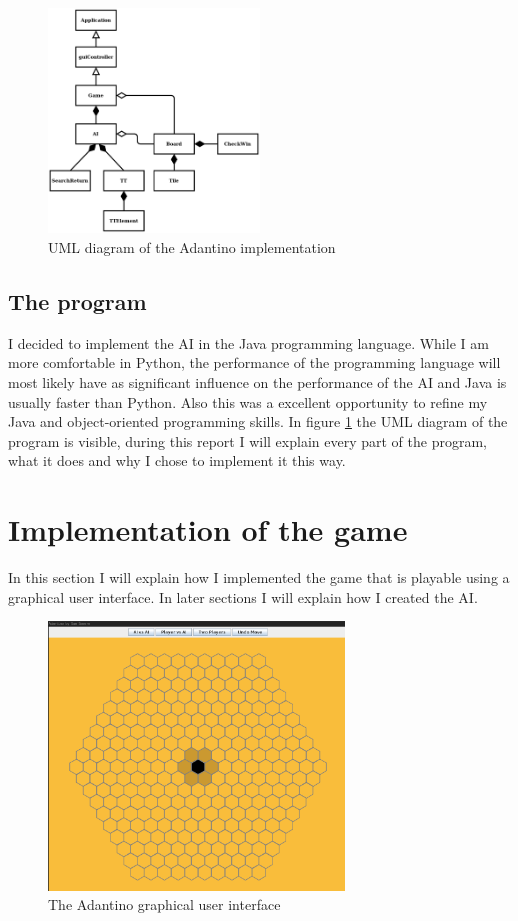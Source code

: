 \documentclass{article}
\begin{document}
\begin{figure}[ht]
    \centering
    \includegraphics[width = 0.5\textwidth]{images/AdantinoAiUml.png}
    \caption{UML diagram of the Adantino implementation}
    \label{fig:UML}
\end{figure}

\subsection{The program}
I decided to implement the AI in the Java programming language. While I am more comfortable in Python, the performance of the programming language will most likely have as significant influence on the performance of the AI and Java is usually faster than Python. Also this was a excellent opportunity to refine my Java and object-oriented programming skills.
In figure \ref{fig:UML} the UML diagram of the program is visible, during this report I will explain every part of the program, what it does and why I chose to implement it this way.

\section{Implementation of the game}
In this section I will explain how I implemented the game that is playable using a graphical user interface. In later sections I will explain how I created the AI. 

\begin{figure}
    \centering
    \includegraphics[width = 0.7\textwidth]{images/gui.png}
    \caption{The Adantino graphical user interface}
    \label{fig:gui}
\end{figure}
\end{document}
